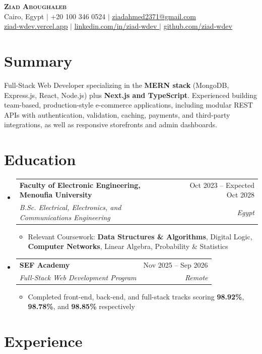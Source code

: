\documentclass[letterpaper,11pt]{article}
\makeatletter
\newcommand{\resumeItem}[1]{ \item\small{ {#1 \vspace{-2pt}} } }
\newcommand{\resumeSubheading}[4]{
  \vspace{-2pt}\item
  \begin{tabular*}{0.97\textwidth}[t]{l@{\extracolsep{\fill}}r} \textbf{#1} & #2
  \\ \textit{\small#3} & \textit{\small #4} \\ \end{tabular*}\vspace{-7pt}
}
\newcommand{\resumeSubHeadingListStart}{\begin{itemize}[
    leftmargin=0.15in,
    label={}
  ]}
\newcommand{\resumeSubHeadingListEnd}{\end{itemize}}
\newcommand{\resumeItemListStart}{\begin{itemize}}
\newcommand{\resumeItemListEnd}{\end{itemize}\vspace{-5pt}}
\makeatother
\begin{document}
\begin{center}
  \textbf{\Huge \scshape Ziad Aboughaleb} \\
  \vspace{1pt}
  \small Cairo, Egypt $|$ +20 100 346 0524 $|$
  \href{mailto:ziadahmed2371@gmail.com}{\underline{ziadahmed2371@gmail.com}} \\
  \href{https://ziad-wdev.vercel.app}{\underline{ziad-wdev.vercel.app}} $|$
  \href{https://linkedin.com/in/ziad-wdev}{\underline{
      linkedin.com/in/ziad-wdev
    }}
  $|$
  \href{https://github.com/ziad-wdev}{\underline{github.com/ziad-wdev}}
\end{center}

\section{Summary}

\small{Full-Stack Web Developer specializing in the \textbf{MERN stack}
  (MongoDB, Express.js, React, Node.js) plus \textbf{Next.js and TypeScript}.
  Experienced building team-based, production-style e-commerce applications,
  including modular REST APIs with authentication, validation, caching,
  payments, and third-party integrations, as well as responsive storefronts and
  admin dashboards.}

\section{Education}

\resumeSubHeadingListStart
\resumeSubheading
{Faculty of Electronic Engineering, Menoufia University}{Oct 2023 -- Expected
  Oct 2028}
{B.Sc. Electrical, Electronics, and Communications Engineering}{Egypt}
\resumeItemListStart
\resumeItem{Relevant Coursework: \textbf{Data Structures \& Algorithms}, Digital
  Logic, \textbf{Computer Networks}, Linear Algebra, Probability \& Statistics}
\resumeItemListEnd
\resumeSubheading
{SEF Academy}{Nov 2025 -- Sep 2026}
{Full-Stack Web Development Program}{Remote}
\resumeItemListStart
  \resumeItem{Completed front-end, back-end, and full-stack tracks scoring
    \textbf{98.92\%}, \textbf{98.78\%}, and \textbf{98.85\%} respectively}
  \resumeItemListEnd
\resumeSubHeadingListEnd

\section{Experience}
\end{document}

